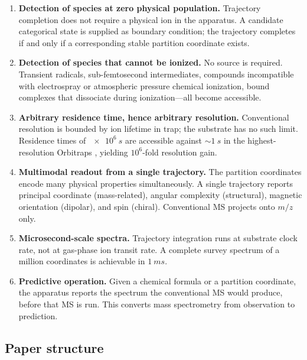 \documentclass[twocolumn,11pt,a4paper]{article}
\theoremstyle{definition}
\theoremstyle{remark}
\begin{document}
\begin{enumerate}[nosep,label=\textbf{C\arabic*.}]
    \item \textbf{Detection of species at zero physical population.} Trajectory completion does not require a physical ion in the apparatus. A candidate categorical state is supplied as boundary condition; the trajectory completes if and only if a corresponding stable partition coordinate exists.
    \item \textbf{Detection of species that cannot be ionized.} No source is required. Transient radicals, sub-femtosecond intermediates, compounds incompatible with electrospray or atmospheric pressure chemical ionization, bound complexes that dissociate during ionization---all become accessible.
    \item \textbf{Arbitrary residence time, hence arbitrary resolution.} Conventional resolution is bounded by ion lifetime in trap; the substrate has no such limit. Residence times of $\SI{e6}{s}$ are accessible against $\sim\SI{1}{s}$ in the highest-resolution Orbitraps \citep{denisov2012}, yielding $10^6$-fold resolution gain.
    \item \textbf{Multimodal readout from a single trajectory.} The partition coordinates encode many physical properties simultaneously. A single trajectory reports principal coordinate (mass-related), angular complexity (structural), magnetic orientation (dipolar), and spin (chiral). Conventional MS projects onto $m/z$ only.
    \item \textbf{Microsecond-scale spectra.} Trajectory integration runs at substrate clock rate, not at gas-phase ion transit rate. A complete survey spectrum of a million coordinates is achievable in $\SI{1}{ms}$.
    \item \textbf{Predictive operation.} Given a chemical formula or a partition coordinate, the apparatus reports the spectrum the conventional MS would produce, before that MS is run. This converts mass spectrometry from observation to prediction.
\end{enumerate}

\subsection{Paper structure}
\end{document}
